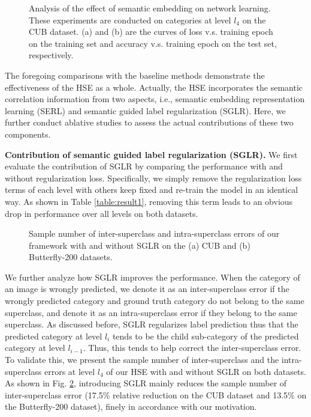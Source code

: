 \documentclass[sigconf]{acmart}
\begin{document}
 \begin{figure}[!t]
 \centering
 \caption{Analysis of the effect of semantic embedding on network learning. These experiments are conducted on categories at level $l_4$ on the CUB dataset. (a) and (b) are the curves of loss v.s. training epoch on the training set and accuracy v.s. training epoch on the test set, respectively.}
 \label{fig:training-curve}
 \end{figure}

The foregoing comparisons with the baseline methods demonstrate the effectiveness of the HSE as a whole. Actually, the HSE incorporates the semantic correlation information from two aspects, i.e., semantic embedding representation learning (SERL) and semantic guided label regularization (SGLR). Here, we further conduct ablative studies to assess the actual contributions of these two components. 

\noindent\textbf{Contribution of semantic guided label regularization (SGLR). }We first evaluate the contribution of SGLR by comparing the performance with and without regularization loss. Specifically, we simply remove the regularization loss terms of each level with others keep fixed and re-train the model in an identical way. As shown in Table \ref{table:result1}, removing this term leads to an obvious drop in performance over all levels on both datasets.

\begin{figure}[!t]
\centering
{}
\caption{Sample number of inter-superclass and intra-superclass errors of our framework with and without SGLR on the (a) CUB and (b) Butterfly-200 datasets.}
\label{fig:error}
\end{figure}

We further analyze how SGLR improves the performance. When the category of an image is wrongly predicted, we denote it as an inter-superclass error if the wrongly predicted category and ground truth category do not belong to the same superclass, and denote it as an intra-superclass error if they belong to the same superclass. As discussed before, SGLR regularizes label prediction thus that the predicted category at level $l_i$ tends to be the child sub-category of the predicted category at level $l_{i-1}$. Thus, this tends to help correct the inter-superclass error. To validate this, we present the sample number of inter-superclass and the intra-superclass errors at level $l_4$ of our HSE with and without SGLR on both datasets. As shown in Fig. \ref{fig:error}, introducing SGLR mainly reduces the sample number of inter-superclass error (17.5\% relative reduction on the CUB dataset and 13.5\% on the Butterfly-200 dataset), finely in accordance with our motivation.
\end{document}
